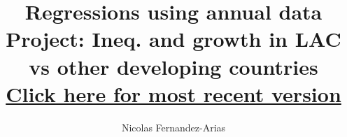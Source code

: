 \documentclass[12pt,english]{article}
\theoremstyle{remark}
\begin{document}
	
	\title{Regressions using annual data\\ \small Project: Ineq. and growth in LAC vs other developing countries \\ \href{.}{Click here for most recent version}}
	\author{Nicolas Fernandez-Arias}
	\maketitle









\footnotesize 



\footnotesize

\normalsize

\footnotesize

\normalsize

\footnotesize

\normalsize

\scriptsize

\scriptsize

\scriptsize

\scriptsize

















\end{document}
